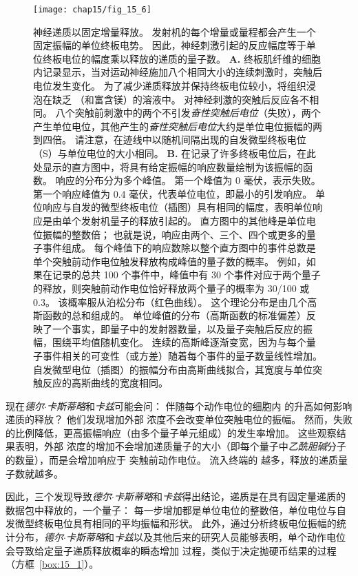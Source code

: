 \begin{figure}[htbp]
	\centering
	\texttt{[image: chap15/fig\_15\_6]}
	\caption{神经递质以固定增量释放。
		发射机的每个增量或量程都会产生一个固定振幅的单位终板电势。
		因此，神经刺激引起的反应幅度等于单位终板电位的幅度乘以释放的递质的量子数。
		\textbf{A.} 终板肌纤维的细胞内记录显示，当对运动神经施加八个相同大小的连续刺激时，突触后电位发生变化。
		为了减少递质释放并保持终板电位较小，将组织浸泡在缺乏 （和富含镁）的溶液中。
		对神经刺激的突触后反应各不相同。
		八个突触前刺激中的两个不引发\textit{奋性突触后电位}（失败），两个产生单位电位，其他产生的\textit{奋性突触后电位}大约是单位电位振幅的两到四倍。
		请注意，在迹线中以随机间隔出现的自发微型终板电位（S）与单位电位的大小相同\cite{liley1956quantal}。
		\textbf{B.} 在记录了许多终板电位后，在此处显示的直方图中，将具有给定振幅的响应数量绘制为该振幅的函数。
		响应的分布分为多个峰值。
		第一个峰值为 0 毫伏，表示失败。
		第一个响应峰值为 0.4 毫伏，代表单位电位，即最小的引发响应。
		单位响应与自发的微型终板电位（插图）具有相同的幅度，表明单位响应是由单个发射机量子的释放引起的。
		直方图中的其他峰是单位电位振幅的整数倍；
		也就是说，响应由两个、三个、四个或更多的量子事件组成。
		每个峰值下的响应数除以整个直方图中的事件总数是单个突触前动作电位触发释放构成峰值的量子数的概率。
		例如，如果在记录的总共 100 个事件中，峰值中有 30 个事件对应于两个量子的释放，则突触前动作电位恰好释放两个量子的概率为 30/100 或 0.3。
		该概率服从泊松分布（红色曲线）。
		这个理论分布是由几个高斯函数的总和组成的。
		单位峰值的分布（高斯函数的标准偏差）反映了一个事实，即量子中的发射器数量，以及量子突触后反应的振幅，围绕平均值随机变化。
		连续的高斯峰逐渐变宽，因为与每个量子事件相关的可变性（或方差）随着每个事件的量子数量线性增加。
		自发微型电位（插图）的振幅分布由高斯曲线拟合，其宽度与单位突触反应的高斯曲线的宽度相同\cite{boyd1956end}。}
	\label{fig:15_6}
\end{figure}


现在\textit{德尔$\cdot$卡斯蒂略}和\textit{卡兹}可能会问：
伴随每个动作电位的细胞内  的升高如何影响递质的释放？
他们发现增加外部  浓度不会改变单位突触电位的振幅。
然而，失败的比例降低，更高振幅响应（由多个量子单元组成）的发生率增加。
这些观察结果表明，外部  浓度的增加不会增加递质量子的大小（即每个量子中\textit{乙酰胆碱}分子的数量），而是会增加响应于 突触前动作电位。
流入终端的  越多，释放的递质量子数就越多。


因此，三个发现导致\textit{德尔$\cdot$卡斯蒂略}和\textit{卡兹}得出结论，递质是在具有固定量递质的数据包中释放的，一个量子：
每一步增加都是单位电位的整数倍，单位电位与自发微型终板电位具有相同的平均振幅和形状。
此外，通过分析终板电位振幅的统计分布，\textit{德尔$\cdot$卡斯蒂略}和\textit{卡兹}以及其他后来的研究人员能够表明，单个动作电位会导致给定量子递质释放概率的瞬态增加 过程，类似于决定抛硬币结果的过程（方框~\ref{box:15_1}）。


